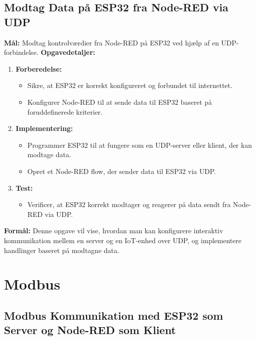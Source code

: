 \documentclass[12pt,a4paper]{book}
\begin{document}
	\subsection*{Modtag Data på ESP32 fra Node-RED via UDP}
	\textbf{Mål:} Modtag kontrolværdier fra Node-RED på ESP32 ved hjælp af en UDP-forbindelse.
	\newline\newline\noindent
	\textbf{Opgavedetaljer:}
	\begin{enumerate}
		\item \textbf{Forberedelse:}
		\begin{itemize}
			\item Sikre, at ESP32 er korrekt konfigureret og forbundet til internettet.
			\item Konfigurer Node-RED til at sende data til ESP32 baseret på foruddefinerede kriterier.
		\end{itemize}
		\item \textbf{Implementering:}
		\begin{itemize}
			\item Programmer ESP32 til at fungere som en UDP-server eller klient, der kan modtage data.
			\item Opret et Node-RED flow, der sender data til ESP32 via UDP.
		\end{itemize}
		\item \textbf{Test:}
		\begin{itemize}
			\item Verificer, at ESP32 korrekt modtager og reagerer på data sendt fra Node-RED via UDP.
		\end{itemize}
	\end{enumerate}
	\textbf{Formål:} Denne opgave vil vise, hvordan man kan konfigurere interaktiv kommunikation mellem en server og en IoT-enhed over UDP, og implementere handlinger baseret på modtagne data.
	
	\section{Modbus}
	\subsection*{Modbus Kommunikation med ESP32 som Server og Node-RED som Klient}
\end{document}
